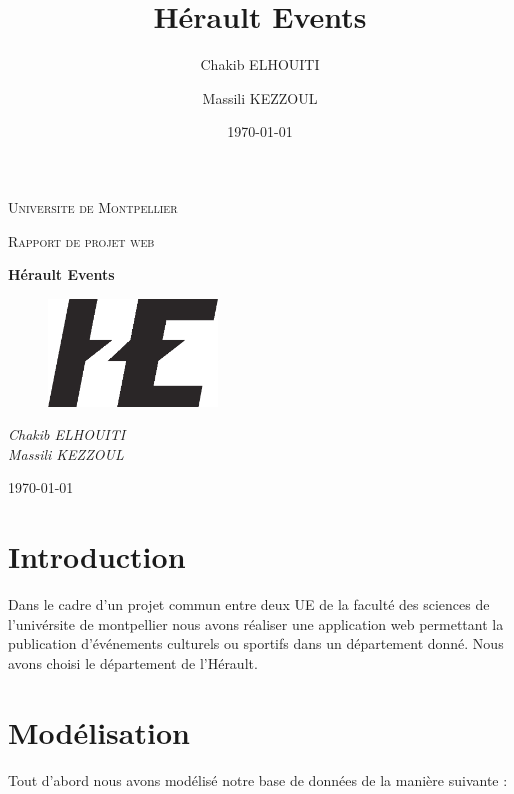 \documentclass[oneside,11pt,a4paper]{article}
\title{Hérault Events}
\author{
    Chakib ELHOUITI \and
    Massili KEZZOUL 
}
\date{\today}
\begin{document}
\begin{titlepage}
	\centering
	{\scshape\LARGE Universite de Montpellier\par}
	{\scshape\Large Rapport de projet web\par}
	\vspace{1.5cm}
	{\huge\bfseries Hérault Events\par}
	\vspace{2cm}
	\begin{figure}[h]
		\centering
		\includegraphics[width=0.4\textwidth]{../view/img/logo/HE-noir.png}
	\end{figure}
	\vspace{2cm}
	{\Large\itshape
		Chakib ELHOUITI \\
		Massili KEZZOUL \\
		\par}

	\vspace{1.5cm}


	
\vfill
	{\large \today\par}
\end{titlepage}
\section{Introduction}

Dans le cadre d'un projet commun entre deux UE de la faculté des sciences de l'univérsite de montpellier nous avons réaliser une application web permettant la publication d’événements culturels ou sportifs dans un département donné. Nous avons choisi le département de l'Hérault.

\section{Modélisation}

Tout d'abord nous avons modélisé notre base de données de la manière suivante : 
\end{document}
